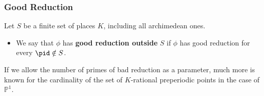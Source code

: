 \documentclass{beamer}
\def\jump{ \quad \\ \vspace{0.7cm} \pause}
\def\PP{{\mathbb P}}
\theoremstyle{thmstyle}
\theoremstyle{thmstyle}
\theoremstyle{mystyle}
\theoremstyle{qstnstyle}
\begin{document}
%
%
%
%
%

\begin{frame}
\frametitle{Good Reduction}
Let $S$ be a finite set of places $K$, including all archimedean ones.

\begin{itemize}
\item We say that $\phi$  has \textbf{good reduction outside} $S$ if $\phi$ has good reduction for every $\pid \notin S$.


\end{itemize}

If we allow the number of primes of bad reduction as a parameter, much more is known for the cardinality of the set of $K$-rational preperiodic points in the case of $\PP^1$. 
\end{frame}
\end{document}
